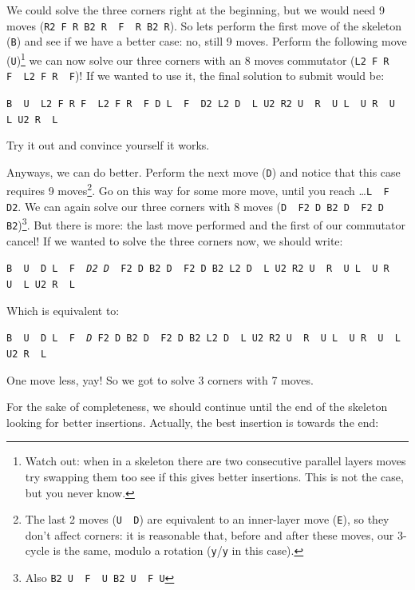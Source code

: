 \documentclass[11pt,a4paper]{book}
\newcommand{\p}{\textquotesingle}
\newcommand{\m}{\texttt}
\newcommand{\ps}{\p\,\,}
\begin{document}
We could solve the three corners right at the beginning, but we would need 9 moves (\m{R2 F R B2 R\ps F\ps R B2 R}). So lets perform the first move of the skeleton (\m{B\p}) and see if we have a better case: no, still 9 moves. Perform the following move (\m{U\p})\footnote{Watch out: when in a skeleton there are two consecutive parallel layers moves try swapping them too see if this gives better insertions. This is not the case, but you never know.} we can now solve our three corners with an 8 moves commutator (\m{L2 F R F\ps L2 F R\ps F\p})! If we wanted to use it, the final solution to submit would be:

\begin{center}
\m{B\ps U\ps {\color{red}L2 F R F\ps L2 F R\ps F\p} D L\ps F\ps D2 L2 D\ps L U2 R2 U\ps R\ps U L\ps U R\ps U\ps L U2 R\ps L\ps}
\end{center}

Try it out and convince yourself it works.

Anyways, we can do better. Perform the next move (\m D) and notice that this case requires 9 moves\footnote{The last 2 moves (\m{U\ps D}) are equivalent to an inner-layer move (\m{E\p}), so they don't affect corners: it is reasonable that, before and after these moves, our 3-cycle is the same, modulo a rotation (\m{y\p}/\m{y} in this case).}. Go on this way for some more move, until you reach \dots\m{L\ps F\ps D2}. We can again solve our three corners with 8 moves (\m{D\ps F2 D B2 D\ps F2 D B2})\footnote{Also \m{B2 U\ps F\ps U B2 U\ps F U}}. But there is more: the last move performed and the first of our commutator cancel! If we wanted to solve the three corners now, we should write:

\begin{center}
\m{B\ps U\ps D L\ps F\ps \emph{D2} {\color{red}\emph{D}\ps F2 D B2 D\ps F2 D B2} L2 D\ps L U2 R2 U\ps R\ps U L\ps U R\ps U\ps L U2 R\ps L\p}
\end{center}

Which is equivalent to:

\begin{center}
\m{B\ps U\ps D L\ps F\ps {\color{red}\emph{D} F2 D B2 D\ps F2 D B2} L2 D\ps L U2 R2 U\ps R\ps U L\ps U R\ps U\ps L U2 R\ps L\p}
\end{center}

One move less, yay! So we got to solve 3 corners with 7 moves.

For the sake of completeness, we should continue until the end of the skeleton looking for better insertions. Actually, the best insertion is towards the end:
\end{document}
